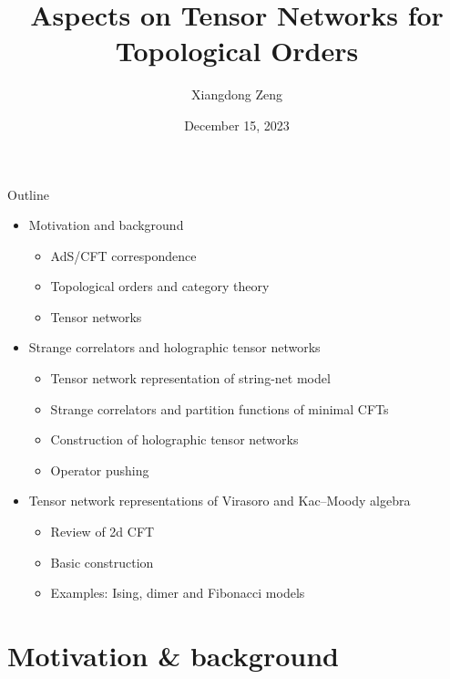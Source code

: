\documentclass{fdubeamer}
\title{Aspects on Tensor Networks for Topological Orders}
\author{Xiangdong Zeng}
\institute{Supervisor: Prof.\ Ling-Yan Hung}
\date{December 15, 2023}
\begin{document}
\maketitle

\begin{frame}{Outline}

\begin{itemize}
  \item Motivation and background

    \begin{itemize}
      \item AdS/CFT correspondence
      \item Topological orders and category theory
      \item Tensor networks
    \end{itemize}

  \item Strange correlators and holographic tensor networks

    \begin{itemize}
      \item Tensor network representation of string-net model
      \item Strange correlators and partition functions of minimal CFTs
      \item Construction of holographic tensor networks
      \item Operator pushing
    \end{itemize}

  \item Tensor network representations of Virasoro and Kac--Moody algebra

    \begin{itemize}
      \item Review of 2d CFT
      \item Basic construction
      \item Examples: Ising, dimer and Fibonacci models
    \end{itemize}
\end{itemize}

\end{frame}

\section{Motivation \& background}
\end{document}
